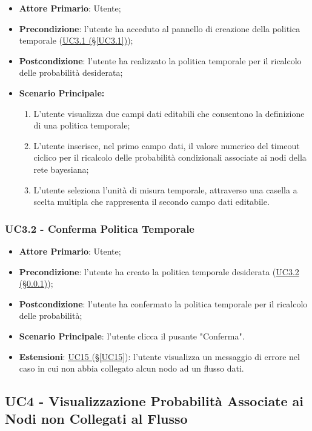\begin{itemize}
	\item \textbf{Attore Primario}: Utente;
	\item \textbf{Precondizione}: l'utente ha acceduto al pannello di creazione della politica temporale (\hyperref[UC3.1]{UC3.1 (§\ref*{UC3.1})});
	\item \textbf{Postcondizione}: l'utente ha realizzato la politica temporale per il ricalcolo delle probabilità desiderata;
	\item \textbf{Scenario Principale:}
	\begin{enumerate}
		\item L'utente visualizza due campi dati editabili che consentono la definizione di una politica temporale;
		\item L'utente inserisce, nel primo campo dati, il valore numerico del timeout ciclico per il ricalcolo delle probabilità condizionali associate ai nodi della rete bayesiana;
		\item L'utente seleziona l'unità di misura temporale, attraverso una casella a scelta multipla che rappresenta il secondo campo dati editabile.
	\end{enumerate}

\end{itemize}

\subsubsection{UC3.2 - Conferma Politica Temporale}\label{UC3.2}
\begin{itemize}
	\item \textbf{Attore Primario}: Utente;
	\item \textbf{Precondizione}: l'utente ha creato la politica temporale desiderata (\hyperref[UC3.2]{UC3.2 (§\ref*{UC3.2})});
	\item \textbf{Postcondizione}: l'utente ha confermato la politica temporale per il ricalcolo delle probabilità;
	\item \textbf{Scenario Principale}: l'utente clicca il pusante "Conferma".
	\item \textbf{Estensioni}: \hyperref[UC15]{UC15 (§\ref*{UC15})}: l'utente visualizza un messaggio di errore nel caso in cui non abbia collegato alcun nodo ad un flusso dati.
\end{itemize}

\newpage

\subsection{UC4 - Visualizzazione Probabilità Associate ai Nodi non Collegati al Flusso}\label{UC4}

